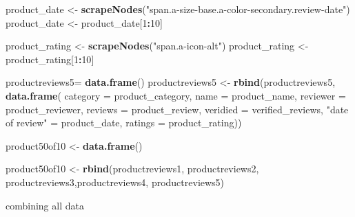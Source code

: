 \documentclass[
]{article}
\newenvironment{Shaded}{\begin{snugshade}}{\end{snugshade}}
\newcommand{\AttributeTok}[1]{\textcolor[rgb]{0.13,0.29,0.53}{#1}}
\newcommand{\DecValTok}[1]{\textcolor[rgb]{0.00,0.00,0.81}{#1}}
\newcommand{\FunctionTok}[1]{\textcolor[rgb]{0.13,0.29,0.53}{\textbf{#1}}}
\newcommand{\NormalTok}[1]{#1}
\newcommand{\OtherTok}[1]{\textcolor[rgb]{0.56,0.35,0.01}{#1}}
\newcommand{\SpecialCharTok}[1]{\textcolor[rgb]{0.81,0.36,0.00}{\textbf{#1}}}
\newcommand{\StringTok}[1]{\textcolor[rgb]{0.31,0.60,0.02}{#1}}
\begin{document}
\begin{Shaded}
\begin{Highlighting}[]
\NormalTok{  product\_date }\OtherTok{\textless{}{-}} \FunctionTok{scrapeNodes}\NormalTok{(}\StringTok{"span.a{-}size{-}base.a{-}color{-}secondary.review{-}date"}\NormalTok{)}
\NormalTok{  product\_date }\OtherTok{\textless{}{-}}\NormalTok{ product\_date[}\DecValTok{1}\SpecialCharTok{:}\DecValTok{10}\NormalTok{]}
  
\NormalTok{  product\_rating }\OtherTok{\textless{}{-}} \FunctionTok{scrapeNodes}\NormalTok{(}\StringTok{"span.a{-}icon{-}alt"}\NormalTok{)}
\NormalTok{  product\_rating }\OtherTok{\textless{}{-}}\NormalTok{ product\_rating[}\DecValTok{1}\SpecialCharTok{:}\DecValTok{10}\NormalTok{]}
  
\NormalTok{  productreviews5}\OtherTok{=} \FunctionTok{data.frame}\NormalTok{()}
\NormalTok{  productreviews5 }\OtherTok{\textless{}{-}} \FunctionTok{rbind}\NormalTok{(productreviews5, }\FunctionTok{data.frame}\NormalTok{(}
                      \AttributeTok{category =}\NormalTok{ product\_category,}
                      \AttributeTok{name =}\NormalTok{ product\_name,}
                      \AttributeTok{reviewer =}\NormalTok{ product\_reviewer,}
                      \AttributeTok{reviews =}\NormalTok{ product\_review,}
                      \AttributeTok{veridied =}\NormalTok{ verified\_reviews,}
                      \StringTok{"date of review"} \OtherTok{=}\NormalTok{ product\_date,}
                      \AttributeTok{ratings =}\NormalTok{ product\_rating))}
  
\NormalTok{  product50of10 }\OtherTok{\textless{}{-}} \FunctionTok{data.frame}\NormalTok{()}
  
\NormalTok{  product50of10 }\OtherTok{\textless{}{-}} \FunctionTok{rbind}\NormalTok{(productreviews1, productreviews2, productreviews3,productreviews4, productreviews5)}
\end{Highlighting}
\end{Shaded}

combining all data
\end{document}

